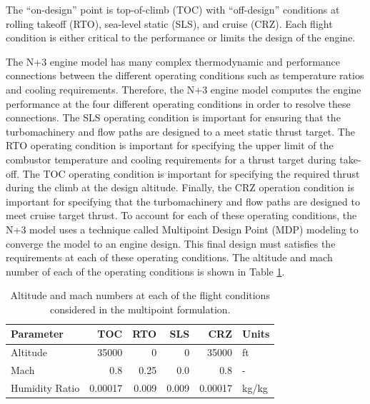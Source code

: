 \documentclass[conf]{new-aiaa}
\begin{document}
The ``on-design'' point is top-of-climb (TOC) with ``off-design'' conditions at rolling takeoff (RTO), sea-level static (SLS), and cruise (CRZ).
Each flight condition is either critical to the performance or limits the design of the engine.

The N+3 engine model has many complex thermodynamic and performance connections between the different operating conditions such as temperature ratios and cooling requirements.
Therefore, the N+3 engine model computes the engine performance at the four different operating conditions in order to resolve these connections.
The SLS operating condition is important for ensuring that the turbomachinery and flow paths are designed to a meet static thrust target.
The RTO operating condition is important for specifying the upper limit of the combustor temperature and cooling requirements for a thrust target during take-off.
The TOC operating condition is important for specifying the required thrust during the climb at the design altitude.
Finally, the CRZ operation condition is important for specifying that the turbomachinery and flow paths are designed to meet cruise target thrust.
To account for each of these operating conditions, the N+3 model uses a technique called Multipoint Design Point (MDP) modeling to converge the model to an engine design.
This final design must satisfies the requirements at each of these operating conditions.
The altitude and mach number of each of the operating conditions is shown in Table \ref{flight_conds}.

\begin{table}[hbt!]
    \centering
    \caption{Altitude and mach numbers at each of the flight conditions considered in the multipoint formulation.
    }
    \begin{tabular}{l r r r r l}
        \hline
        Parameter      & TOC     & RTO   & SLS   & CRZ     & Units      \\
        \hline
        Altitude       & 35000   & 0     & 0     & 35000   & \si{ft}    \\
        Mach           & 0.8     & 0.25  & 0.0   & 0.8     & -          \\
        Humidity Ratio & 0.00017 & 0.009 & 0.009 & 0.00017 & \si{kg/kg} \\
        \hline
    \end{tabular}
    \label{flight_conds}
\end{table}
\end{document}
